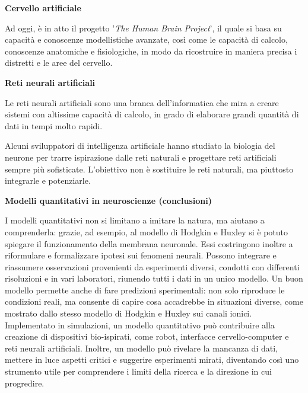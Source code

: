 \documentclass[12pt,a4paper,openany]{book}
\begin{document}
\textbf{Cervello artificiale}

Ad oggi, è in atto il progetto '\textit{The Human Brain Project}', il quale si basa su capacità e conoscenze modellistiche avanzate, così come le capacità di calcolo, conoscenze anatomiche e fisiologiche, in modo da ricostruire in maniera precisa i distretti e le aree del cervello.

\textbf{Reti neurali artificiali}

Le reti neurali artificiali sono una branca dell'informatica che mira a creare sistemi con altissime capacità di calcolo, in grado di elaborare grandi quantità di dati in tempi molto rapidi.

Alcuni sviluppatori di intelligenza artificiale hanno studiato la biologia del neurone per trarre ispirazione dalle reti naturali e progettare reti artificiali sempre più sofisticate. L'obiettivo non è sostituire le reti naturali, ma piuttosto integrarle e potenziarle.

\textbf{Modelli quantitativi in neuroscienze (conclusioni)}

I modelli quantitativi non si limitano a imitare la natura, ma aiutano a comprenderla: grazie, ad esempio, al modello di Hodgkin e Huxley si è potuto spiegare il funzionamento della membrana neuronale. Essi costringono inoltre a riformulare e formalizzare ipotesi sui fenomeni neurali. Possono integrare e riassumere osservazioni provenienti da esperimenti diversi, condotti con differenti risoluzioni e in vari laboratori, riunendo tutti i dati in un unico modello. Un buon modello permette anche di fare predizioni sperimentali: non solo riproduce le condizioni reali, ma consente di capire cosa accadrebbe in situazioni diverse, come mostrato dallo stesso modello di Hodgkin e Huxley sui canali ionici. Implementato in simulazioni, un modello quantitativo può contribuire alla creazione di dispositivi bio-ispirati, come robot, interfacce cervello-computer e reti neurali artificiali. Inoltre, un modello può rivelare la mancanza di dati, mettere in luce aspetti critici e suggerire esperimenti mirati, diventando così uno strumento utile per comprendere i limiti della ricerca e la direzione in cui progredire.
\end{document}
